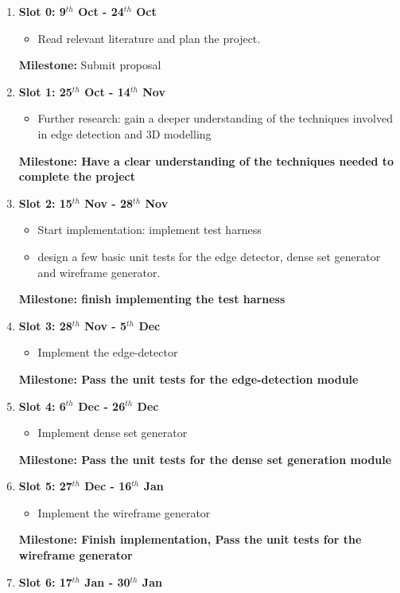 \begin{enumerate}

\item {\bf Slot 0: 9$^{th}$ Oct - 24$^{th}$ Oct}
	\begin{itemize}
		\item Read relevant literature and plan the project.
	\end{itemize}
	{\bf Milestone:} Submit proposal
\item {\bf Slot 1: 25$^{th}$ Oct - 14$^{th}$ Nov}
	\begin{itemize}
		\item Further research: gain a deeper understanding of the techniques involved in edge detection and 3D modelling
	\end{itemize}
	{\bf Milestone: Have a clear understanding of the techniques needed to complete the project} 
\item {\bf Slot 2: 15$^{th}$ Nov  - 28$^{th}$ Nov}
	\begin{itemize}
		\item Start implementation: implement test harness
		\item design a few basic unit tests for the edge detector, dense set generator and wireframe generator.
	\end{itemize}
	{\bf Milestone: finish implementing the test harness}
\item {\bf Slot 3: 28$^{th}$ Nov  - 5$^{th}$ Dec}
	\begin{itemize}
		\item Implement the edge-detector
	\end{itemize}
	{\bf Milestone: Pass the unit tests for the edge-detection module} 
\item {\bf Slot 4: 6$^{th}$ Dec -  26$^{th}$ Dec}
	\begin{itemize}
		\item Implement dense set generator
	\end{itemize}
	{\bf Milestone: Pass the unit tests for the dense set generation module} 
\item {\bf Slot 5: 27$^{th}$ Dec - 16$^{th}$ Jan}
	\begin{itemize}
		\item Implement the wireframe generator
	\end{itemize}
	{\bf Milestone: Finish implementation, Pass the unit tests for the wireframe generator} 
\item {\bf Slot 6: 17$^{th}$ Jan  - 30$^{th}$ Jan}
	\begin{itemize}

\end{itemize}
\end{enumerate}
